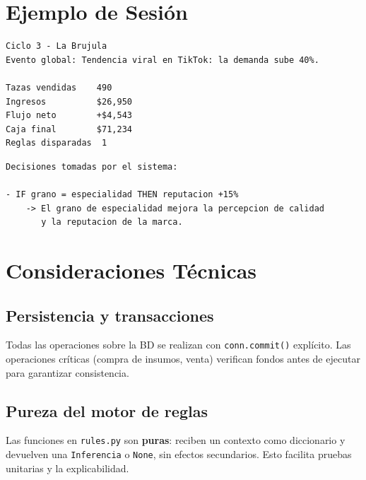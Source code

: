 \documentclass[12pt, a4paper]{article}
\begin{document}
\section{Ejemplo de Sesión}

\begin{lstlisting}[language={}, caption={Ejemplo de salida de /ciclo\_avanzar}]
Ciclo 3 - La Brujula
Evento global: Tendencia viral en TikTok: la demanda sube 40%.

Tazas vendidas    490
Ingresos          $26,950
Flujo neto        +$4,543
Caja final        $71,234
Reglas disparadas  1
\end{lstlisting}

\begin{lstlisting}[language={}, caption={Reporte del Supervisor (Ver explicacion)}]
Decisiones tomadas por el sistema:

- IF grano = especialidad THEN reputacion +15%
    -> El grano de especialidad mejora la percepcion de calidad
       y la reputacion de la marca.
\end{lstlisting}

\section{Consideraciones Técnicas}

\subsection{Persistencia y transacciones}

Todas las operaciones sobre la BD se realizan con \texttt{conn.commit()}
explícito. Las operaciones críticas (compra de insumos, venta) verifican
fondos antes de ejecutar para garantizar consistencia.

\subsection{Pureza del motor de reglas}

Las funciones en \texttt{rules.py} son \textbf{puras}: reciben un contexto
como diccionario y devuelven una \texttt{Inferencia} o \texttt{None}, sin
efectos secundarios. Esto facilita pruebas unitarias y la explicabilidad.
\end{document}
